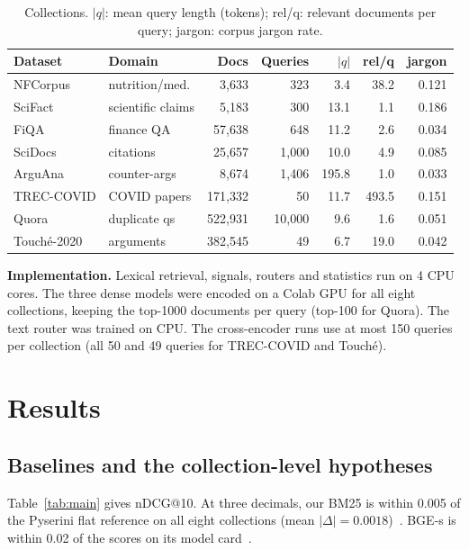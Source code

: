 \documentclass[conference]{IEEEtran}
\makeatletter
\newcommand{\ndcg}{nDCG@10}
\makeatother
\begin{document}
\begin{table}[t]
\centering
\caption{Collections. $|q|$: mean query length (tokens); rel/q: relevant documents per query; jargon: corpus jargon rate.}
\label{tab:data}
\footnotesize
\setlength{\tabcolsep}{2.5pt}
\begin{tabular}{@{}llrrrrr@{}}
\toprule
Dataset & Domain & Docs & Queries & $|q|$ & rel/q & jargon \\
\midrule
NFCorpus & nutrition/med. & 3,633 & 323 & 3.4 & 38.2 & 0.121 \\
SciFact & scientific claims & 5,183 & 300 & 13.1 & 1.1 & 0.186 \\
FiQA & finance QA & 57,638 & 648 & 11.2 & 2.6 & 0.034 \\
SciDocs & citations & 25,657 & 1,000 & 10.0 & 4.9 & 0.085 \\
ArguAna & counter-args & 8,674 & 1,406 & 195.8 & 1.0 & 0.033 \\
TREC-COVID & COVID papers & 171,332 & 50 & 11.7 & 493.5 & 0.151 \\
Quora & duplicate qs & 522,931 & 10,000 & 9.6 & 1.6 & 0.051 \\
Touch\'e-2020 & arguments & 382,545 & 49 & 6.7 & 19.0 & 0.042 \\
\bottomrule
\end{tabular}
\end{table}

\textbf{Implementation.} Lexical retrieval, signals, routers and statistics run on 4 CPU cores. The three dense models were encoded on a Colab GPU for all eight collections, keeping the top-1000 documents per query (top-100 for Quora). The text router was trained on CPU. The cross-encoder runs use at most 150 queries per collection (all 50 and 49 queries for TREC-COVID and Touch\'e).

\section{Results}
\subsection{Baselines and the collection-level hypotheses}
Table~\ref{tab:main} gives \ndcg{}. At three decimals, our BM25 is within 0.005 of the Pyserini flat reference on all eight collections (mean $|\Delta|=0.0018$)~\cite{kamalloo2024resources}. BGE-s is within 0.02 of the scores on its model card~\cite{hf_bgesmall}.
\end{document}
